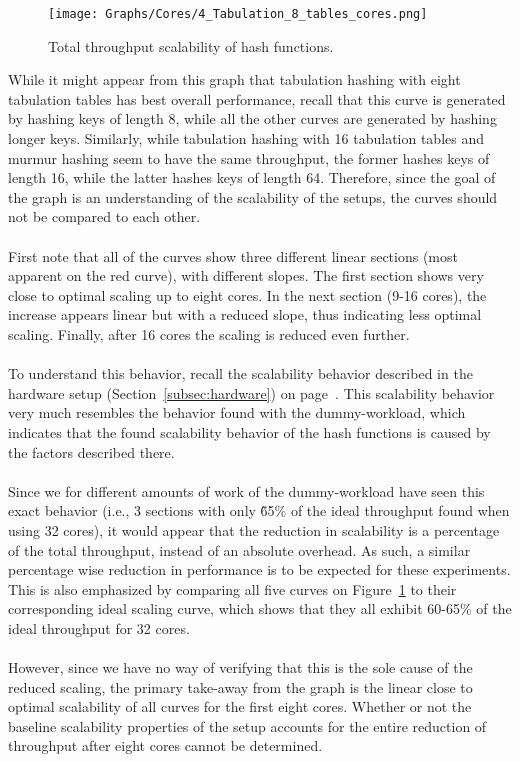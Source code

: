 \documentclass[11pt]{report} %
\begin{document}
\begin{figure}[H]
  \centering
  \texttt{[image: Graphs/Cores/4\_Tabulation\_8\_tables\_cores.png]}\\
  \caption{Total throughput scalability of hash functions.}
  \label{fig:tab_cores}
\end{figure}
\noindent
While it might appear from this graph that tabulation hashing with eight tabulation tables has best overall performance, recall that this curve is generated by hashing keys of length 8, while all the other curves are generated by hashing longer keys. Similarly, while tabulation hashing with 16 tabulation tables and murmur hashing seem to have the same throughput, the former hashes keys of length 16, while the latter hashes keys of length 64. Therefore, since the goal of the graph is an understanding of the scalability of the setups, the curves should not be compared to each other.\\
\\
First note that all of the curves show three different linear sections (most apparent on the red curve), with different slopes. The first section shows very close to optimal scaling up to eight cores. In the next section (9-16 cores), the increase appears linear but with a reduced slope, thus indicating less optimal scaling. Finally, after 16 cores the scaling is reduced even further. \\
\\
To understand this behavior, recall the scalability behavior described in the hardware setup (Section~\ref{subsec:hardware}) on page~\pageref{subsec:hardware}. This scalability behavior very much resembles the behavior found with the dummy-workload, which indicates that the found scalability behavior of the hash functions is caused by the factors described there. \\
\\
Since we for different amounts of work of the dummy-workload have seen this exact behavior (i.e., 3 sections with only \~65\% of the ideal throughput found when using 32 cores), it would appear that the reduction in scalability is a percentage of the total throughput, instead of an absolute overhead. As such, a similar percentage wise reduction in performance is to be expected for these experiments. This is also emphasized by  comparing all five curves on Figure~\ref{fig:tab_cores} to their corresponding ideal scaling curve, which shows that they all exhibit 60-65\% of the ideal throughput for 32 cores.\\
\\
However, since we have no way of verifying that this is the sole cause of the reduced scaling, the primary take-away from the graph is the linear close to optimal scalability of all curves for the first eight cores. Whether or not the baseline scalability properties of the setup accounts for the entire reduction of throughput after eight cores cannot be determined.
\end{document}
